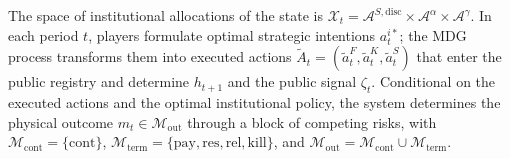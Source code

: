 \documentclass[review,authoryear,12pt]{elsarticle}
\theoremstyle{plain}
\theoremstyle{definition}
\newcommand{\1}{\mathbf{1}}
\begin{document}
The space of institutional allocations of the state is $\mathcal{X}_t=\mathcal{A}^{S,\mathrm{disc}}\times\mathcal{A}^{\alpha}\times\mathcal{A}^{\gamma}$. In each period $t$, players formulate optimal strategic intentions $a_t^{i\ast}$; the MDG process transforms them into executed actions $\tilde{A}_t=(\tilde{a}_t^F,\tilde{a}_t^K,\tilde{a}_t^S)$ that enter the public registry and determine $h_{t+1}$ and the public signal $\zeta_t$. Conditional on the executed actions and the optimal institutional policy, the system determines the physical outcome $m_t\in\mathcal{M}_{\mathrm{out}}$ through a block of competing risks, with $\mathcal{M}_{\mathrm{cont}}=\{\mathrm{cont}\}$, $\mathcal{M}_{\mathrm{term}}=\{\mathrm{pay},\mathrm{res},\mathrm{rel},\mathrm{kill}\}$, and $\mathcal{M}_{\mathrm{out}}=\mathcal{M}_{\mathrm{cont}}\cup\mathcal{M}_{\mathrm{term}}$.
\end{document}
